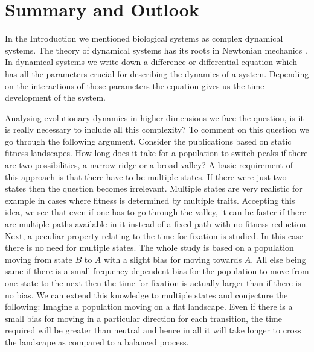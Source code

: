 \documentclass[oneside,11pt,a4paper]{book}
\renewcommand{\baselinestretch}{1.1}
\begin{document}
\def\baselinestretch{1}
\chapter{Summary and Outlook}
\label{chap:conclu}

\graphicspath{{Discussionfigs/}{Discussionfigs/}{Discussionfigs/}}

\def\baselinestretch{1.66}

In the Introduction we mentioned biological systems as complex dynamical systems.
The theory of dynamical systems has its roots in Newtonian mechanics \citep{strogatz:2000bb}.
In dynamical systems we write down a difference or differential equation which has all the parameters crucial for describing the dynamics of a system.
Depending on the interactions of those parameters the equation gives us the time development of the system.

Analysing evolutionary dynamics in higher dimensions we face the question, is it is really necessary to include all this complexity?
To comment on this question we go through the following argument.
Consider the publications based on static fitness landscapes.
How long does it take for a population to switch peaks if there are two possibilities, a narrow ridge or a broad valley?
A basic requirement of this approach is that there have to be multiple states.
If there were just two states then the question becomes irrelevant.
Multiple states are very realistic for example in cases where fitness is determined by multiple traits.
Accepting this idea, we see that even if one has to go through the valley, it can be faster if there are multiple paths available in it instead of a fixed path with no fitness reduction.
Next, a peculiar property relating to the time for fixation is studied.
In this case there is no need for multiple states.
The whole study is based on a population moving from state $B$ to $A$ with a slight bias for moving towards $A$.
All else being same if there is a small frequency dependent bias for the population to move from one state to the next then the time for fixation is actually larger than if there is no bias. 
We can extend this knowledge to multiple states and conjecture the following:
Imagine a population moving on a flat landscape.
Even if there is a small bias for moving in a particular direction for each transition, the time required will be greater than neutral and hence in all it will take longer to cross the landscape as compared to a balanced process.
\end{document}
